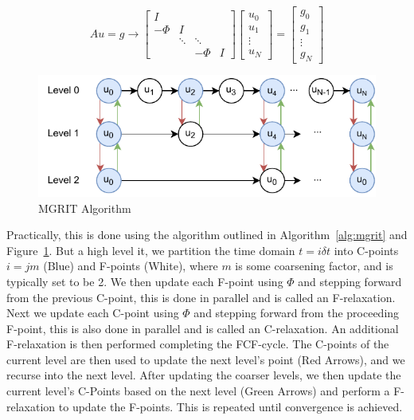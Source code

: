 \documentclass{article}
\begin{document}
\begin{equation}\label{eq:mgrit}
    A u = g \to
    \begin{bmatrix}
    I &  &  &  \\
    -\Phi & I & &  \\
    & \ddots  & \ddots  &  \\
    &  & -\Phi & I
   \end{bmatrix}
   \begin{bmatrix}
   u_0 \\
   u_1 \\
   \vdots \\
   u_N
   \end{bmatrix}
   =
   \begin{bmatrix}
   g_0 \\
   g_1 \\
   \vdots \\
   g_N
   \end{bmatrix}
\end{equation}

\begin{figure}
    \centering
    \includegraphics[width=\linewidth]{docs/assets/mgrit_cycle.pdf}
    \caption{MGRIT Algorithm\label{fig:mgrit}}
\end{figure}

Practically, this is done using the algorithm outlined in Algorithm~\ref{alg:mgrit} and Figure~\ref{fig:mgrit}.
But a high level it, we partition the time domain \(t = i \delta t\) into C-points \(i = jm\) (Blue) and F-points (White),
where \(m\) is some coarsening factor, and is typically set to be 2.
We then update each F-point using \(\Phi\) and stepping forward from the previous C-point, this is done in parallel and is called an F-relaxation.
Next we update each C-point using \(\Phi\) and stepping forward from the proceeding F-point, this is also done in parallel and is called an C-relaxation.
An additional F-relaxation is then performed completing the FCF-cycle.
The C-points of the current level are then used to update the next level's point (Red Arrows), and we recurse into the next level.
After updating the coarser levels, we then update the current level's C-Points based on the next level (Green Arrows) and perform a F-relaxation to update the F-points.
This is repeated until convergence is achieved.
\end{document}
